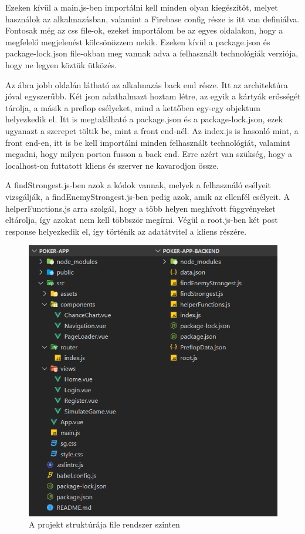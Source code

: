 Ezeken kívül a main.js-ben importálni kell minden olyan kiegészítőt, melyet használok az alkalmazásban, valamint a Firebase config része is itt van definiálva. Fontosak még az css file-ok, ezeket importálom be az egyes oldalakon, hogy a megfelelő megjelenést kölcsönözzem nekik. Ezeken kívül a package.json és package-lock.json file-okban meg vannak adva a felhasznált technológiák verziója, hogy ne legyen köztük ütközés.

Az ábra jobb oldalán látható az alkalmazás back end része. Itt az architektúra jóval egyszerűbb. Két json adathalmazt hoztam létre, az egyik a kártyák erősségét tárolja, a másik a preflop esélyeket, mind a kettőben egy-egy objektum helyezkedik el. Itt is megtalálható a package.json és a package-lock.json, ezek ugyanazt a szerepet töltik be, mint a front end-nél. Az index.js is hasonló mint, a front end-en, itt is be kell importálni minden felhasznált technológiát, valamint megadni, hogy milyen porton fusson a back end. Erre azért van szükség, hogy a localhost-on futtatott kliens és szerver ne kavarodjon össze.

A findStrongest.js-ben azok a kódok vannak, melyek a felhasználó esélyeit vizsgálják, a findEnemyStrongest.js-ben pedig azok, amik az ellenfél esélyeit. A helperFunctions.js arra szolgál, hogy a több helyen meghívott függvényeket eltárolja, így azokat nem kell többször megírni. Végül a root.js-ben két post response helyezkedik el, így történik az adatátvitel a kliens részére.

\begin{figure}[h]
\centering
\includegraphics[scale=0.85]{images/frontend-backend-arch.png}
\caption{A projekt struktúrája file rendszer szinten}
\label{fig:frontend-backend-arch}
\end{figure}

